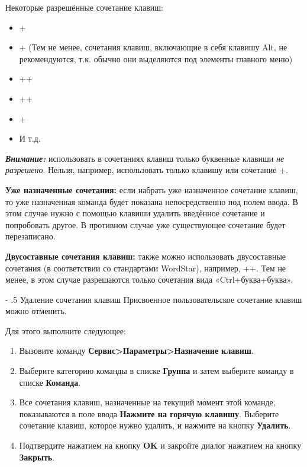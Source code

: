 ﻿\documentclass[a4paper,10pt]{article}
\makeatletter
\renewcommand\paragraph{%
   \@startsection{paragraph}{4}{0mm}%
      {-\baselineskip}%
      {.5\baselineskip}%
      {\normalfont\normalsize\bfseries}}
\makeatother
\begin{document}
 Некоторые разрешённые сочетание клавиш:
 
 \begin{itemize}
  \item {}+
  \item {}+ (Тем не менее, сочетания клавиш, включающие в себя клавишу Alt, не рекомендуются, т.к. обычно они выделяются под элементы главного меню)
  \item {}++
  \item {}++
  \item {}+
  \item  И т.д.
 \end{itemize}

 \begin{mdframed}[backgroundcolor=blue!10]
\textbf{\textit{Внимание:}} использовать в сочетаниях клавиш только буквенные клавиши \textit{не разрешено}. Нельзя, например, использовать только клавишу  или сочетание +.
\end{mdframed}
 
 \textbf{Уже назначенные сочетания:} если набрать уже назначенное сочетание клавиш, то уже назначенная команда будет показана непосредственно под полем ввода. В этом случае нужно с помощью клавиши  удалить введённое сочетание и попробовать другое. В противном случае уже существующее сочетание будет перезаписано. 
 
 \textbf{Двусоставные сочетания клавиш:} также можно использовать двусоставные сочетания (в соответствии со стандартами WordStar), например, ++. Тем не менее, в этом случае разрешаются только сочетания вида «Ctrl+буква+буква».
 
 \paragraph{Удаление сочетания клавиш}
 Присвоенное пользовательское сочетание клавиш можно отменить.
 
 Для этого выполните следующее:
 \begin{enumerate}
  \item Вызовите команду \textbf{Сервис>Параметры>Назначение клавиш}.
  \item Выберите категорию команды в списке \textbf{Группа} и затем выберите команду в списке \textbf{Команда}.
  \item Все сочетания клавиш, назначенные на текущий момент этой команде, показываются в поле ввода \textbf{Нажмите на горячую клавишу}. Выберите сочетание клавиш, которое нужно удалить, и нажмите на кнопку \textbf{Удалить}.
  \item Подтвердите нажатием на кнопку \textbf{OK} и закройте диалог нажатием на кнопку \textbf{Закрыть}.
 \end{enumerate}
\end{document}
